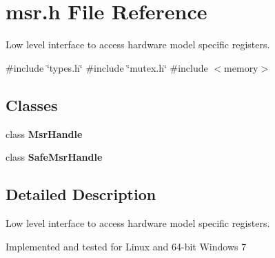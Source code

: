 \section{msr.\+h File Reference}
\label{msr_8h}


Low level interface to access hardware model specific registers.  


{\ttfamily \#include \char`\"{}types.\+h\char`\"{}}\newline
{\ttfamily \#include \char`\"{}mutex.\+h\char`\"{}}\newline
{\ttfamily \#include $<$memory$>$}\newline
\subsection*{Classes}
\begin{DoxyCompactItemize}
\item 
class \textbf{ Msr\+Handle}
\item 
class \textbf{ Safe\+Msr\+Handle}
\end{DoxyCompactItemize}


\subsection{Detailed Description}
Low level interface to access hardware model specific registers. 

Implemented and tested for Linux and 64-\/bit Windows 7 